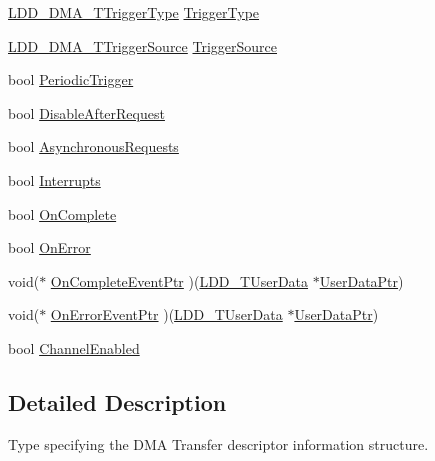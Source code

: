 \begin{DoxyCompactItemize}
\hyperlink{group___p_e___types__module_ga5590e47d6e7263ae9257e0d231c89521}{L\+D\+D\+\_\+\+D\+M\+A\+\_\+\+T\+Trigger\+Type} \hyperlink{struct_l_d_d___d_m_a___t_transfer_descriptor_a1d1ff275b5c883b0cad1b20ef1929716}{Trigger\+Type}
\item 
\hyperlink{group___p_e___types__module_ga8af21cbad27c8d061a98924a11fc5a9b}{L\+D\+D\+\_\+\+D\+M\+A\+\_\+\+T\+Trigger\+Source} \hyperlink{struct_l_d_d___d_m_a___t_transfer_descriptor_a770d0bde209b081eafe87892ed333084}{Trigger\+Source}
\item 
bool \hyperlink{struct_l_d_d___d_m_a___t_transfer_descriptor_aa29036eb34e794f3abbfea02be51711f}{Periodic\+Trigger}
\item 
bool \hyperlink{struct_l_d_d___d_m_a___t_transfer_descriptor_af47462df9934c927bd3cb1c8c7a4aa94}{Disable\+After\+Request}
\item 
bool \hyperlink{struct_l_d_d___d_m_a___t_transfer_descriptor_aca370900692e662cc4828e68e2c31f0a}{Asynchronous\+Requests}
\item 
bool \hyperlink{struct_l_d_d___d_m_a___t_transfer_descriptor_a2dd483b9c7608a34cc231114f2642271}{Interrupts}
\item 
bool \hyperlink{struct_l_d_d___d_m_a___t_transfer_descriptor_a1b9c560066718de0c2e9b5e0c6b2a3c5}{On\+Complete}
\item 
bool \hyperlink{struct_l_d_d___d_m_a___t_transfer_descriptor_a3ddeb9c7243015b0ee7afd15235ce37b}{On\+Error}
\item 
void($\ast$ \hyperlink{struct_l_d_d___d_m_a___t_transfer_descriptor_a7a3c1cd12b7f66760b5d02989409ac48}{On\+Complete\+Event\+Ptr} )(\hyperlink{group___p_e___types__module_ga0b66a73f87238a782318aa0be7578e35}{L\+D\+D\+\_\+\+T\+User\+Data} $\ast$\hyperlink{struct_l_d_d___d_m_a___t_transfer_descriptor_a4136d6742944c7b04a94695c78b581b8}{User\+Data\+Ptr})
\item 
void($\ast$ \hyperlink{struct_l_d_d___d_m_a___t_transfer_descriptor_a9d97c36a86505594fd2642c1242f7460}{On\+Error\+Event\+Ptr} )(\hyperlink{group___p_e___types__module_ga0b66a73f87238a782318aa0be7578e35}{L\+D\+D\+\_\+\+T\+User\+Data} $\ast$\hyperlink{struct_l_d_d___d_m_a___t_transfer_descriptor_a4136d6742944c7b04a94695c78b581b8}{User\+Data\+Ptr})
\item 
bool \hyperlink{struct_l_d_d___d_m_a___t_transfer_descriptor_acf5f8fe95f319b19a591880ed8a7a3c0}{Channel\+Enabled}
\end{DoxyCompactItemize}


\subsection{Detailed Description}
Type specifying the D\+MA Transfer descriptor information structure. 

